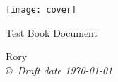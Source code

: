 \documentclass[a4paper,10pt]{book}
\newcommand{\bigsize}{\fontsize{35pt}{20pt}\selectfont}
\begin{document}
\begin{titlepage}
\centering
\texttt{[image: cover]}
 
{\bigsize Test Book Document}
 
Rory  \\
{\small\em \copyright \  Draft date \today }
\end{titlepage}
\end{document}
